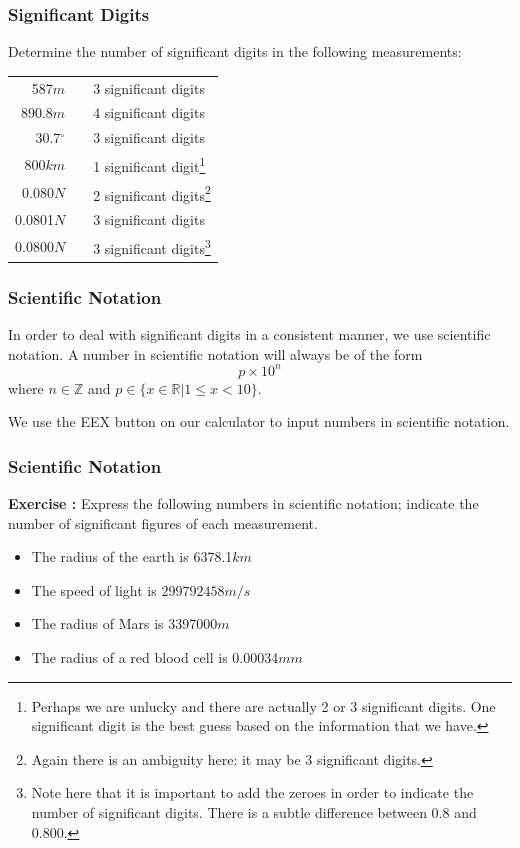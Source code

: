 \documentclass[xcolor=dvipsnames]{beamer}
\newcounter{exercise}
\newcommand{\ubung}[0]{\refstepcounter{exercise}\textbf{Exercise \arabic{exercise}: }}
\begin{document}
\begin{frame}
  \frametitle{Significant Digits}
  Determine the number of significant digits in the following
  measurements:

\bigskip

  \begin{tabular}{rcl}
587$m$ & \hspace{.5in} & 3 significant digits \\
890.8$m$ & \hspace{.5in} & 4 significant digits \\
30.7$^{\circ}$ & \hspace{.5in} & 3 significant digits \\
800$km$ & \hspace{.5in} & 1 significant digit\footnote{Perhaps we are unlucky and there are actually 2 or 3 significant digits. One significant digit is the best guess based on the information that we have.} \\
0.080$N$ & \hspace{.5in} & 2 significant digits\footnote{Again there is an ambiguity here: it may be 3 significant digits.} \\
0.0801$N$ & \hspace{.5in} & 3 significant digits \\
0.0800$N$ & \hspace{.5in} & 3 significant digits\footnote{Note here that it is important to add the zeroes in order to indicate the number of significant digits. There is a subtle difference between $0.8$ and $0.800$.} \\
  \end{tabular}
\end{frame}

\begin{frame}
  \frametitle{Scientific Notation}
  In order to deal with significant digits in a consistent manner,
  we use scientific notation. A number in scientific notation will
  always be of the form
  \begin{equation}
    \label{eq:saegahni}
    p\times{}10^{n}
  \end{equation}
where $n\in\mathbb{Z}$ and $p\in\{x\in\mathbb{R}|1\leq{}x<10\}$.

\bigskip

We use the \textsc{EEX} button on our calculator to input numbers in
scientific notation.
\end{frame}

\begin{frame}
  \frametitle{Scientific Notation}
{\ubung} Express the following numbers in scientific notation; indicate the number of significant figures of each measurement.
\begin{itemize}
\item The radius of the earth is 6378.1$km$
\item The speed of light is $299792458m/s$
\item The radius of Mars is 3397000$m$
\item The radius of a red blood cell is 0.00034$mm$
\end{itemize}
\end{frame}
\end{document}
